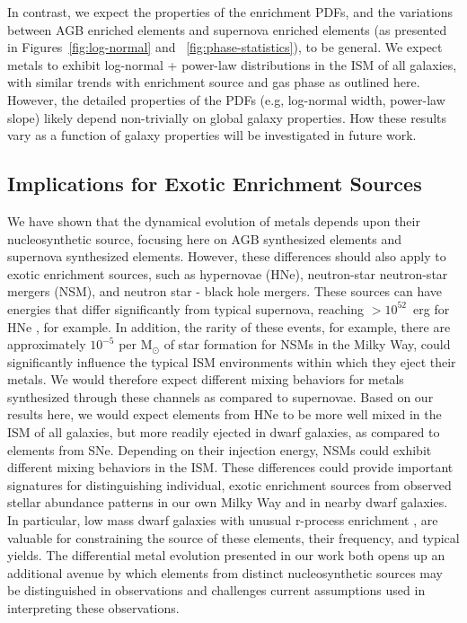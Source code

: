 \documentclass[twocolumn]{aastex61}
\begin{document}
In contrast, we expect the properties of the enrichment PDFs, and the variations between AGB enriched elements and supernova enriched elements (as presented in Figures~\ref{fig:log-normal} and ~\ref{fig:phase-statistics}), to be general. We expect metals to exhibit log-normal + power-law distributions in the ISM of all galaxies, with similar trends with enrichment source and gas phase as outlined here. However, the detailed properties of the PDFs (e.g, log-normal width, power-law slope) likely depend non-trivially on global galaxy properties. How these results vary as a function of galaxy properties will be investigated in future work.



%
%
\subsection{Implications for Exotic Enrichment Sources}
\label{sec:exotic enrichment}
We have shown that the dynamical evolution of metals depends upon their nucleosynthetic source, focusing here on AGB synthesized elements and supernova synthesized elements. However, these differences should also apply to exotic enrichment sources, such as hypernovae (HNe), neutron-star neutron-star mergers (NSM), and neutron star - black hole mergers. These sources can have energies that differ significantly from typical supernova, reaching $> 10^{52}$~erg for HNe \citep{Nomoto2004}, for example. In addition, the rarity of these events, for example, there are approximately $10^{-5}$ per M$_{\odot}$ of star formation for NSMs \citep{Kim2015} in the Milky Way, could significantly influence the typical ISM environments within which they eject their metals. We would therefore expect different mixing behaviors for metals synthesized through these channels as compared to supernovae. Based on our results here, we would expect elements from HNe to be more well mixed in the ISM of all galaxies, but more readily ejected in dwarf galaxies, as compared to elements from SNe. 
Depending on their injection energy, NSMs could exhibit different mixing behaviors in the ISM. These differences could provide important signatures for distinguishing individual, exotic enrichment sources from observed stellar abundance patterns in our own Milky Way and in nearby dwarf galaxies. In particular, low mass dwarf galaxies with unusual r-process enrichment \citep[e.g.][]{Ji2016}, are valuable for constraining the source of these elements, their frequency, and typical yields. The differential metal evolution presented in our work both opens up an additional avenue by which elements from distinct nucleosynthetic sources may be distinguished in observations and challenges current assumptions used in interpreting these observations.
\end{document}
